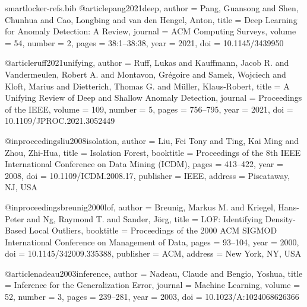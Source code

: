 \begin{filecontents*}[overwrite]{smartlocker-refs.bib}
@article{pang2021deep,
  author  = {Pang, Guansong and Shen, Chunhua and Cao, Longbing and van den Hengel, Anton},
  title   = {Deep Learning for Anomaly Detection: A Review},
  journal = {ACM Computing Surveys},
  volume  = {54},
  number  = {2},
  pages   = {38:1--38:38},
  year    = {2021},
  doi     = {10.1145/3439950}
}

@article{ruff2021unifying,
  author  = {Ruff, Lukas and Kauffmann, Jacob R. and Vandermeulen, Robert A. and Montavon, Gr{\'e}goire and Samek, Wojciech and Kloft, Marius and Dietterich, Thomas G. and M{\"u}ller, Klaus-Robert},
  title   = {A Unifying Review of Deep and Shallow Anomaly Detection},
  journal = {Proceedings of the IEEE},
  volume  = {109},
  number  = {5},
  pages   = {756--795},
  year    = {2021},
  doi     = {10.1109/JPROC.2021.3052449}
}

@inproceedings{liu2008isolation,
  author    = {Liu, Fei Tony and Ting, Kai Ming and Zhou, Zhi-Hua},
  title     = {Isolation Forest},
  booktitle = {Proceedings of the 8th IEEE International Conference on Data Mining (ICDM)},
  pages     = {413--422},
  year      = {2008},
  doi       = {10.1109/ICDM.2008.17},
  publisher = {IEEE},
  address   = {Piscataway, NJ, USA}
}

@inproceedings{breunig2000lof,
  author    = {Breunig, Markus M. and Kriegel, Hans-Peter and Ng, Raymond T. and Sander, J{\"o}rg},
  title     = {{LOF}: Identifying Density-Based Local Outliers},
  booktitle = {Proceedings of the 2000 ACM SIGMOD International Conference on Management of Data},
  pages     = {93--104},
  year      = {2000},
  doi       = {10.1145/342009.335388},
  publisher = {ACM},
  address   = {New York, NY, USA}
}

@article{nadeau2003inference,
  author  = {Nadeau, Claude and Bengio, Yoshua},
  title   = {Inference for the Generalization Error},
  journal = {Machine Learning},
  volume  = {52},
  number  = {3},
  pages   = {239--281},
  year    = {2003},
  doi     = {10.1023/A:1024068626366}
}
\end{filecontents*}

\documentclass[sigconf]{acmart}
\usepackage{tikz}
\usetikzlibrary{arrows.meta,positioning,fit,shapes.geometric}
\setlength{\emergencystretch}{2em}
\renewcommand{\topfraction}{0.9}
\renewcommand{\bottomfraction}{0.8}
\renewcommand{\textfraction}{0.07}
\renewcommand{\floatpagefraction}{0.85}
\setcounter{topnumber}{3}
\setcounter{bottomnumber}{2}
\setcounter{totalnumber}{5}


